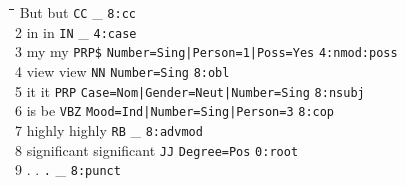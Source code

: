\begin{figure}[h]
\footnotesize
\begin{tabbing}
\hspace*{0.5cm}\=\hspace*{1.75cm}\=\hspace*{1.75cm}\=\hspace*{1cm}\=\hspace*{5.25cm}\=	\>	But			\>	but					\>	\texttt{CC}		\>	\_											\>	\texttt{8:cc}					\\[1.5mm]
2	\>	in 			\>	in					\>	\texttt{IN} 		\>	\_											\>	\texttt{4:case}					\\[1.5mm]
3	\>	my			\>	my					\>	\texttt{PRP\$}	\>	\texttt{Number=Sing|Person=1|Poss=Yes}				\>	\texttt{4:nmod:poss}				\\[1.5mm]
4	\>	view			\>	view 					\>	\texttt{NN}		\>	\texttt{Number=Sing}								\>	\texttt{8:obl}					\\[1.5mm]
5	\>	it 			\>	it					\>	\texttt{PRP}	\> 	\texttt{Case=Nom|Gender=Neut|Number=Sing}			\>	\texttt{8:nsubj}					\\[1.5mm]
6	\>	is			\>	be					\>	\texttt{VBZ}	\>	\texttt{Mood=Ind|Number=Sing|Person=3}				\>	\texttt{8:cop}					\\[1.5mm]
7	\>	highly		\>	highly				\>	\texttt{RB}		\>	\_											\>	\texttt{8:advmod}				\\[1.5mm]
8	\>	significant 		\>	significant				\>	\texttt{JJ}		\>	\texttt{Degree=Pos}								\>	\texttt{0:root}					\\[1.5mm]
9	\>	.			\>	.					\>	\texttt{.}		\>	\_											\>	\texttt{8:punct}
\end{tabbing}
\end{figure}